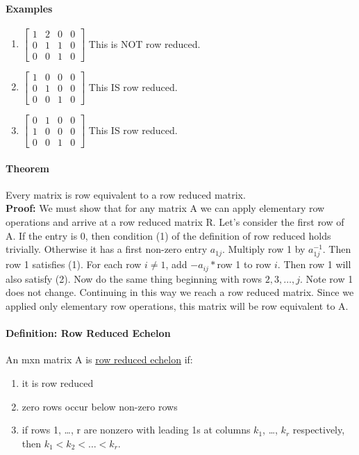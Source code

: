 \documentclass[10pt,letter]{article}
\begin{document}
\paragraph*{Examples}
\begin{enumerate}
    \item $\begin{bmatrix}
    1 & 2 & 0 & 0 \\
    0 & 1 & 1 & 0 \\
    0 & 0 & 1 & 0  
\end{bmatrix}$ This is NOT row reduced. 
\item $\begin{bmatrix}
    1 & 0 & 0 & 0 \\
    0 & 1 & 0 & 0 \\
    0 & 0 & 1 & 0  
\end{bmatrix}$ This IS row reduced. 
\item $\begin{bmatrix}
    0 & 1 & 0 & 0 \\
    1 & 0 & 0 & 0 \\
    0 & 0 & 1 & 0  
\end{bmatrix}$ This IS row reduced. 
\end{enumerate}

\paragraph*{Theorem}
Every matrix is row equivalent to a row reduced matrix. \\ 
\textbf{Proof:} We must show that for any matrix A we can apply elementary row operations and arrive at a row reduced matrix R. Let's consider the first row of A. If the entry is 0, then condition (1) of the definition of row reduced holds trivially. Otherwise it has a first non-zero entry $a_{1j}$. Multiply row 1 by $a_{1j}^{-1}$. Then row 1 satisfies (1). For each row $i\neq 1$, add $-a_{ij}*$row 1 to row $i$. Then row 1 will also satisfy (2). Now do the same thing beginning with rows $2,3,\ldots,j$. Note row 1 does not change. Continuing in this way we reach a row reduced matrix. Since we applied only elementary row operations, this matrix will be row equivalent to A. 

\paragraph*{Definition: Row Reduced Echelon}
An mxn matrix A is \underline{row reduced echelon} if:
\begin{enumerate}
    \item it is row reduced
    \item zero rows occur below non-zero rows
    \item if rows 1, \dots, r are nonzero with leading 1s at columns $k_1$, \dots, $k_r$ respectively, then $k_1<k_2<\ldots<k_r$. 
\end{enumerate}
\end{document}
